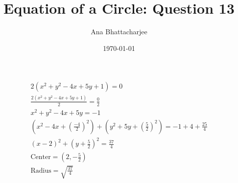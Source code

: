 \documentclass{article}
\begin{document}
\author{Ana Bhattacharjee}
\title{Equation of a Circle: Question 13}
\date{\today}
\maketitle{}

\begin{center}
  \begin{align}
    2(x^2 + y^2 - 4x + 5y + 1) = 0 \\
    \frac{2(x^2 + y^2 - 4x + 5y + 1)}{2} = \frac{0}{2} \\
    x^2 + y^2 - 4x + 5y = -1 \\
    (x^2 - 4x + (\frac{-4}{2})^2) + (y^2 + 5y + (\frac{5}{2})^2) = -1 + 4 + \frac{25}{4} \\
    (x - 2)^2 + (y + \frac{5}{2})^2 = \frac{37}{4} \\
    \text{Center} = (2, -\frac{5}{2}) \\
    \text{Radius} = \sqrt{\frac{37}{4}}
  \end{align}
\end{center}
\end{document}
